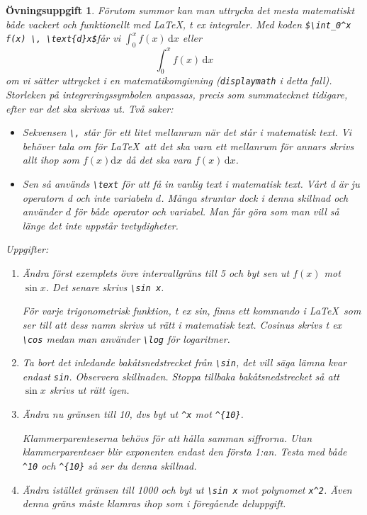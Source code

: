 \documentclass[12pt,a4wide]{article}
\theoremstyle{uppgiftsstil}
\newcommand{\ovningstext}{Övningsuppgift}
\newtheorem{ovning}{\ovningstext}
\newenvironment{uppgift}{\begin{framed}\begin{ovning}}%
                        {\end{ovning}\end{framed}}
\theoremstyle{avklaradstil}
\begin{document}
\begin{uppgift}
  Förutom summor kan man uttrycka det mesta matematiskt både vackert
  och funktionellt med \LaTeX, t ex integraler. Med koden 
  \verb|$\int_0^x  f(x) \, \text{d}x$|får vi $\int_0^x  f(x) \,
  \text{d}x$ eller  
  \begin{displaymath}
    \int_0^x f(x) \, \text{d}x
  \end{displaymath}
  om vi sätter uttrycket i en matematikomgivning (\verb|displaymath| i
  detta fall). Storleken på integreringssymbolen anpassas, precis som
  summatecknet tidigare, efter var det ska skrivas ut. Två saker:
  \begin{itemize}
    \item Sekvensen \verb|\,| står för ett litet mellanrum när det
      står i matematisk text. Vi behöver tala om för \LaTeX\ att det
      ska vara ett mellanrum för annars skrivs allt ihop som $f(x)
      \text{d} x$ då det ska vara $f(x) \, \text{d} x$. 
    \item Sen så används \verb|\text| för att få in vanlig text i
      matematisk text. Vårt d är ju operatorn d och inte variabeln
      $d$. Många struntar dock i denna skillnad och använder $d$ för
      både operator och variabel. Man får göra som man vill så länge
      det inte uppstår tvetydigheter.
  \end{itemize}
  Uppgifter:
  \begin{enumerate}
    \item Ändra först exemplets övre intervallgräns till 5 och byt sen
      ut $f(x)$ mot $\sin x$. Det senare skrivs \verb|\sin x|.  

      För varje trigonometrisk funktion, t ex sin, finns ett kommando
      i \LaTeX\ som ser till att dess namn skrivs ut rätt i matematisk
      text. Cosinus skrivs t ex \verb|\cos| medan man använder
      \verb|\log| för logaritmer.  
    \item Ta bort det inledande bakåtsnedstrecket från \verb|\sin|,
      det vill säga lämna kvar endast \verb|sin|. Observera
      skillnaden. Stoppa tillbaka bakåtsnedstrecket så att $\sin x$
      skrivs ut rätt igen. 
    \item Ändra nu gränsen till 10, dvs byt ut \verb|^x| mot
      \verb|^{10}|. 

      Klammerparenteserna behövs för att hålla samman siffrorna. Utan
      klammerparenteser blir exponenten endast den första 1:an. Testa
      med både \verb|^10| och  \verb|^{10}| så ser du denna skillnad. 
    \item Ändra istället gränsen till 1000 och byt ut \verb|\sin x| 
      mot polynomet \verb|x^2|. Även denna gräns måste klamras ihop
      som i föregående deluppgift. 


\end{enumerate}
\end{uppgift}
\end{document}
